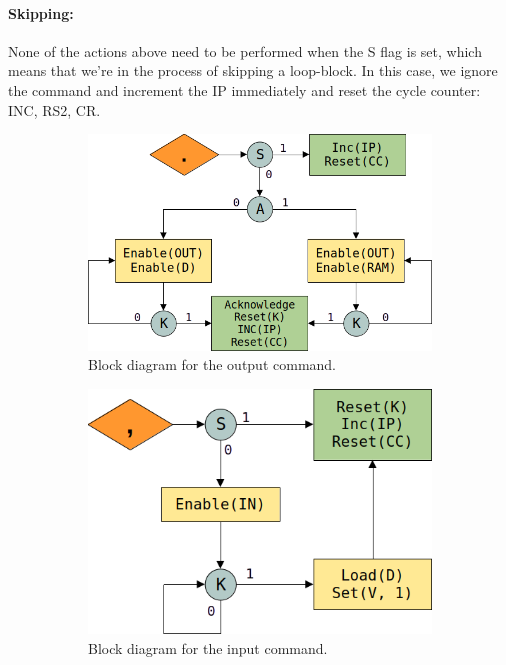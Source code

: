 \paragraph{Skipping:} None of the actions above need to be performed when the S flag is set, which means that we're in the process of skipping a loop-block. In this case, we ignore the command and increment the IP immediately and reset the cycle counter: INC, RS2, CR.

\begin{figure}[H]
  \centering
  \mbox{}\hfill
  \begin{subfigure}[t]{0.4\linewidth}
    \centering
    \includegraphics[scale=0.3]{img/outputalg}
    \caption{Block diagram for the output command.}
    \label{fig:inputbufalg}
  \end{subfigure}
  \hfill
  \begin{subfigure}[t]{0.4\linewidth}
    \centering
    \includegraphics[scale=0.3]{img/inputalg}
    \caption{Block diagram for the input command.}
    \label{fig:inputimalg}
  \end{subfigure}
  \hfill\mbox{}
  \caption{}
  \label{fig:inputalg}
\end{figure}

